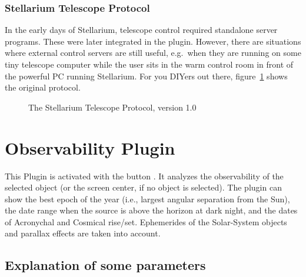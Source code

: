\subsubsection{Stellarium Telescope Protocol}
\label{sec:plugins:TelescopeControl:Other:Protocol}

In the early days of Stellarium, telescope control required standalone server programs. 
These were later integrated in the plugin. However, there are situations where external control servers are still useful, 
e.g.\ when they are running on some tiny telescope computer while the user sits in the warm control room in front of the powerful PC running Stellarium. 
For you DIYers out there, figure~\ref{fig:plugins:TelescopeControl:Other:Protocol} shows the original protocol.


\begin{figure}[bp]
\begin{center}
\end{center}
\caption{The Stellarium Telescope Protocol, version 1.0}
\label{fig:plugins:TelescopeControl:Other:Protocol}
\end{figure}


\newpage
\section{Observability Plugin}
\label{sec:plugins:Observability}

This Plugin is activated with the button . 
It analyzes the observability of the selected object (or the
screen center, if no object is selected). The plugin can show 
the best epoch of the year (i.e.,
largest angular separation from the Sun), the date range when the
source is above the horizon at dark night, and the dates of Acronychal
and Cosmical rise/set.  Ephemerides of the Solar-System objects and
parallax effects are taken into account.

\subsection*{Explanation of some parameters}


